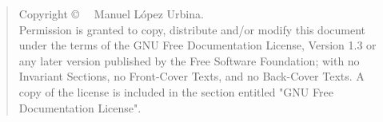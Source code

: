 \begin{quote}
Copyright \copyright~\the\year~ Manuel López Urbina.\\

Permission is granted to copy, distribute and/or modify this document under the terms of the GNU Free Documentation License, Version 1.3 or  any later version published by the Free Software Foundation; with no Invariant Sections, no Front-Cover Texts, and no Back-Cover Texts. A copy of the license is included in the section entitled "GNU Free Documentation License".
\end{quote}


\cleardoublepage

